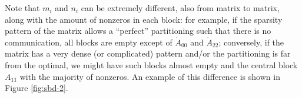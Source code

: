 Note that $m_i$ and $n_i$ can be extremely different, also from matrix to matrix, along with the amount of nonzeros in each block: for example, if the sparsity pattern of the matrix allows a ``perfect'' partitioning such that there is no communication, all blocks are empty except of $\dot{A}_{00}$ and $\dot{A}_{22}$; conversely, if the matrix has a very dense (or complicated) pattern and/or the partitioning is far from the optimal, we might have such blocks almost empty and the central block $\dot{A}_{11}$ with the majority of nonzeros. An example of this difference is shown in Figure \ref{fig:sbd-2}.

\begin{figure}[h]
	\centering
	 \hspace{1cm}

\end{figure}
